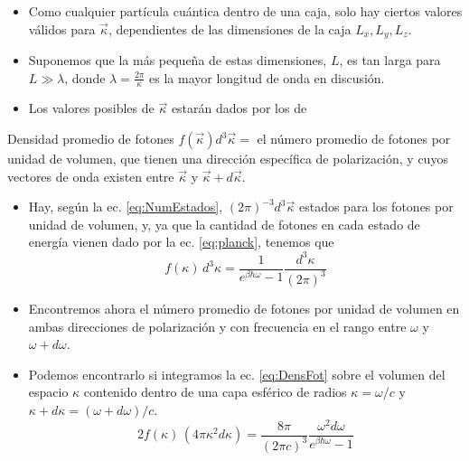\documentclass[aspectratio=1610]{beamer}
\newcommand{\kv}{\Vec{\kappa}}
\begin{document}
\begin{frame}
	\begin{itemize}
		\item Como cualquier partícula cuántica dentro de una caja, solo hay ciertos valores válidos para $\kv$, dependientes de las dimensiones de la caja $L_x,L_y,L_z$.\pause
		\item Suponemos que la más pequeña de estas dimensiones, $L$, es tan larga para $L \gg \lambda$, donde $\lambda = \frac{2\pi}{\kappa}$ es la mayor longitud de onda en discusión.\pause
		\item Los valores posibles de $\kv$ estarán dados por los de
	\end{itemize}\pause
	\begin{block}{Densidad promedio de fotones}
		$f(\kv)d^3\kv =$ el número promedio de fotones por unidad de volumen, que tienen una dirección específica de polarización, y cuyos vectores de onda existen entre $\kv$ y $\kv+d\kv$.
	\end{block}
\end{frame}

\begin{frame}
	\begin{itemize}
		\item Hay, según la ec. \ref{eq:NumEstados}, $(2\pi)^{-3}d^3\kv$ estados para los fotones por unidad de volumen, y, ya que la cantidad de fotones en cada estado de energía vienen dado por la ec. \ref{eq:planck}, tenemos que
		\begin{equation}
			f(\kappa) \, d^3\kappa = \frac{1}{e^{\beta \hbar \omega}-1} \frac{d^3\kappa}{(2\pi)^3}
			\label{eq:DensFot}
		\end{equation}\pause
		\item Encontremos ahora el número promedio de fotones por unidad de volumen en ambas direcciones de polarización y con frecuencia en el rango entre $\omega$ y $\omega+d\omega$.\pause
		\item Podemos encontrarlo si integramos la ec. \ref{eq:DensFot} sobre el volumen del espacio $\kappa$ contenido dentro de una capa esférico de radios $\kappa = \omega/c$ y $\kappa+d\kappa = (\omega+d\omega)/c$. %
		\begin{equation}
			2 f(\kappa) \, (4\pi\kappa^2d\kappa) = \dfrac{8\pi}{(2\pi c)^3}\dfrac{\omega^2d\omega}{e^{\beta\hbar\omega}-1}
		\end{equation}
	\end{itemize}
\end{frame}
\end{document}

